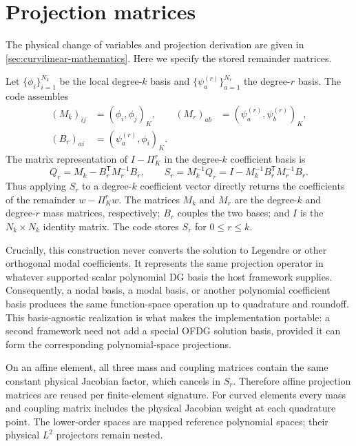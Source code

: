 \section{Projection matrices}
The physical change of variables and projection derivation are given in
\cref{sec:curvilinear-mathematics}. Here we specify the stored remainder matrices.

Let $\{\phi_i\}_{i=1}^{N_k}$ be the local degree-$k$ basis and
$\{\psi_a^{(r)}\}_{a=1}^{N_r}$ the degree-$r$ basis.  The code assembles
\begin{align}
  (M_k)_{ij}&=(\phi_i,\phi_j)_K,
  & (M_r)_{ab}&=(\psi_a^{(r)},\psi_b^{(r)})_K,\\
  (B_r)_{ai}&=(\psi_a^{(r)},\phi_i)_K.
\end{align}
The matrix representation of $I-\Pi_K^r$ in the degree-$k$ coefficient basis is
\begin{equation}
  Q_r=M_k-B_r^\mathsf{T}M_r^{-1}B_r,
  \qquad
  S_r=M_k^{-1}Q_r
     =I-M_k^{-1}B_r^\mathsf{T}M_r^{-1}B_r.
  \label{eq:ofdg-projection-matrices}
\end{equation}
Thus applying $S_r$ to a degree-$k$ coefficient vector directly returns the
coefficients of the remainder $w-\Pi_K^r w$.  The matrices $M_k$ and $M_r$ are
the degree-$k$ and degree-$r$ mass matrices, respectively; $B_r$ couples the two
bases; and $I$ is the $N_k\times N_k$ identity matrix.  The code stores $S_r$
for $0\leq r\leq k$.

Crucially, this construction never converts the solution to Legendre or other
orthogonal modal coefficients.  It represents the same projection operator in
whatever supported scalar polynomial DG basis the host framework supplies.
Consequently, a nodal basis, a modal basis, or another polynomial coefficient
basis produces the same function-space operation up to quadrature and roundoff.
This basis-agnostic realization is what makes the implementation portable: a
second framework need not add a special OFDG solution basis, provided it can
form the corresponding polynomial-space projections.

On an affine element, all three mass
and coupling matrices contain the same constant physical Jacobian factor, which
cancels in $S_r$.  Therefore affine projection matrices are reused per finite-element signature.
For curved elements every mass and coupling matrix includes the physical
Jacobian weight at each quadrature point.  The lower-order spaces are mapped
reference polynomial spaces; their physical $L^2$ projectors remain nested.

